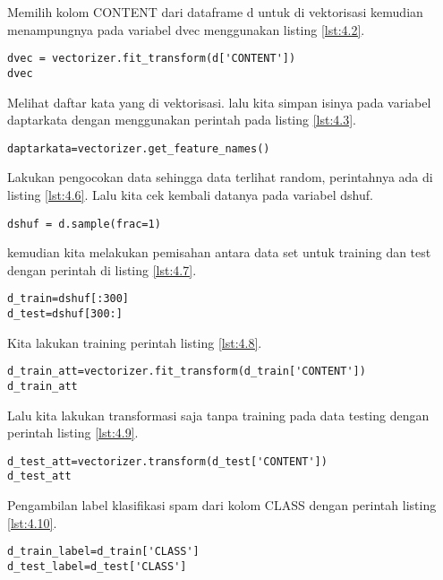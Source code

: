 Memilih kolom CONTENT dari dataframe d untuk di vektorisasi kemudian menampungnya pada variabel dvec menggunakan listing \ref{lst:4.2}.
\begin{lstlisting}[caption=Vektorisasi data dari atribut CONTENT,label={lst:4.2}]
dvec = vectorizer.fit_transform(d['CONTENT'])
dvec
\end{lstlisting}

Melihat daftar kata yang di vektorisasi. lalu kita simpan isinya pada variabel daptarkata dengan menggunakan perintah pada listing \ref{lst:4.3}.
\begin{lstlisting}[caption=Mendapatkan Daftar Kata,label={lst:4.3}]
daptarkata=vectorizer.get_feature_names()
\end{lstlisting}


Lakukan pengocokan data sehingga data terlihat random, perintahnya ada di listing \ref{lst:4.6}. Lalu kita cek kembali datanya pada variabel dshuf. 
\begin{lstlisting}[caption=Mengocok Data Frame,label={lst:4.6}]
dshuf = d.sample(frac=1)
\end{lstlisting}

kemudian kita melakukan pemisahan antara data set untuk training dan test dengan perintah di listing \ref{lst:4.7}.
\begin{lstlisting}[caption=Memisahkan data frame,label={lst:4.7}]
d_train=dshuf[:300]
d_test=dshuf[300:]
\end{lstlisting}

Kita lakukan training perintah listing \ref{lst:4.8}.
\begin{lstlisting}[caption=Training pada vektorisasi atau yang disebut transform dan fit,label={lst:4.8}]
d_train_att=vectorizer.fit_transform(d_train['CONTENT'])
d_train_att
\end{lstlisting}

Lalu kita lakukan transformasi saja tanpa training pada data testing dengan perintah listing \ref{lst:4.9}.
\begin{lstlisting}[caption=Transform tanpa fit dari data testing,label={lst:4.9}]
d_test_att=vectorizer.transform(d_test['CONTENT'])
d_test_att
\end{lstlisting}

Pengambilan label klasifikasi spam dari kolom CLASS dengan perintah listing \ref{lst:4.10}.
\begin{lstlisting}[caption=Pengambilan label dari data testing dan training,label={lst:4.10}]
d_train_label=d_train['CLASS']
d_test_label=d_test['CLASS']
\end{lstlisting}



